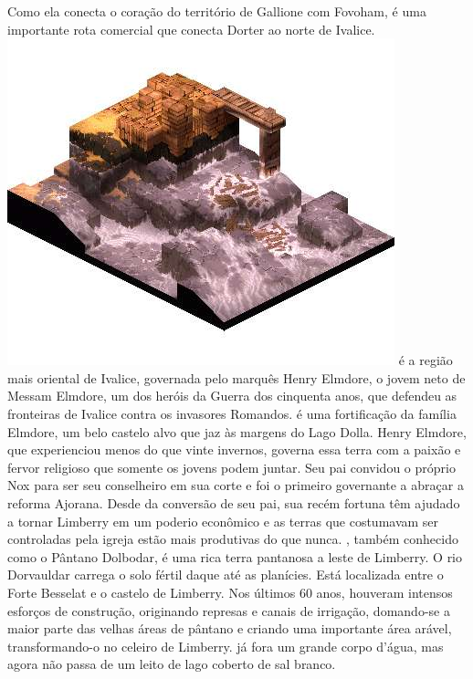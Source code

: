 Como ela conecta o coração do território de Gallione com Fovoham, é uma importante rota comercial que conecta Dorter ao norte de Ivalice.
%
\ofpar
\includegraphics[width=\columnwidth]{./art/worldbook/poeskas.jpg}
\ofpar
%
 é a região mais oriental de Ivalice, governada pelo marquês Henry Elmdore, o jovem neto de Messam Elmdore, um dos heróis da Guerra dos cinquenta anos, que defendeu as fronteiras de Ivalice contra os invasores Romandos.
 é uma fortificação da família Elmdore, um belo castelo alvo que jaz às margens do Lago Dolla.
Henry Elmdore, que experienciou menos do que vinte invernos, governa essa terra com a paixão e fervor religioso que somente os jovens podem juntar.
Seu pai convidou o próprio Nox para ser seu conselheiro em sua corte e foi o primeiro governante a abraçar a reforma Ajorana.
Desde da conversão de seu pai, sua recém fortuna têm ajudado a tornar Limberry em um poderio econômico e as terras que costumavam ser controladas pela igreja estão mais produtivas do que nunca.
, também conhecido como o Pântano Dolbodar, é uma rica terra pantanosa a leste de Limberry.
O rio Dorvauldar carrega o solo fértil daque até as planícies.
Está localizada entre o Forte Besselat e o castelo de Limberry.
Nos últimos 60 anos, houveram intensos esforços de construção, originando represas e canais de irrigação, domando-se a maior parte das velhas áreas de pântano e criando uma importante área arável, transformando-o no celeiro de Limberry.
 já fora um grande corpo d'água, mas agora não passa de um leito de lago coberto de sal branco.
